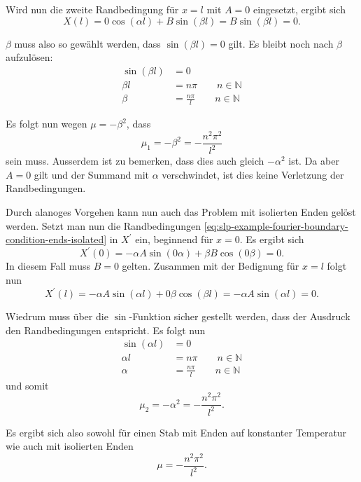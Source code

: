 Wird nun die zweite Randbedingung für $x = l$ mit $A = 0$ eingesetzt, ergibt
sich
\[
    X(l)
    =
    0 \cos(\alpha l) + B \sin(\beta l)
    =
    B \sin(\beta l)
    = 0.
\]

$\beta$ muss also so gewählt werden, dass $\sin(\beta l) = 0$ gilt.
Es bleibt noch nach $\beta$ aufzulösen:
\[
\begin{aligned}
    \sin(\beta l) &= 0 \\
    \beta l &= n \pi \qquad n \in \mathbb{N} \\
    \beta &= \frac{n \pi}{l} \qquad n \in \mathbb{N}
\end{aligned}
\]

Es folgt nun wegen $\mu = -\beta^{2}$, dass
\begin{equation}
    \mu_1 = -\beta^{2} = -\frac{n^{2}\pi^{2}}{l^{2}}
\end{equation}
sein muss.
Ausserdem ist zu bemerken, dass dies auch gleich $-\alpha^{2}$ ist.
Da aber $A = 0$ gilt und der Summand mit $\alpha$ verschwindet, ist dies keine
Verletzung der Randbedingungen.

Durch alanoges Vorgehen kann nun auch das Problem mit isolierten Enden gelöst
werden.
Setzt man nun die Randbedingungen
\eqref{eq:slp-example-fourier-boundary-condition-ends-isolated} in $X^{\prime}$
ein, beginnend für $x = 0$. Es ergibt sich
\[
    X^{\prime}(0)
    =
    -\alpha A \sin(0 \alpha) + \beta B \cos(0 \beta)
    = 0.
\]
In diesem Fall muss $B = 0$ gelten.
Zusammen mit der Bedignung für $x = l$
folgt nun
\[
    X^{\prime}(l)
    =
    - \alpha A \sin(\alpha l) + 0 \beta \cos(\beta l)
    =
    - \alpha A \sin(\alpha l)
    = 0.
\]

Wiedrum muss über die $ \sin $-Funktion sicher gestellt werden, dass der
Ausdruck den Randbedingungen entspricht.
Es folgt nun
\[
\begin{aligned}
    \sin(\alpha l) &= 0 \\
    \alpha l &= n \pi \qquad n \in \mathbb{N} \\
    \alpha &= \frac{n \pi}{l} \qquad n \in \mathbb{N}
\end{aligned}
\]
und somit
\[
    \mu_2 = -\alpha^{2} = -\frac{n^{2}\pi^{2}}{l^{2}}.
\]

Es ergibt sich also sowohl für einen Stab mit Enden auf konstanter Temperatur
wie auch mit isolierten Enden
\begin{equation}
    \label{eq:slp-example-fourier-mu-solution}
    \mu
    =
    -\frac{n^{2}\pi^{2}}{l^{2}}.
\end{equation}

